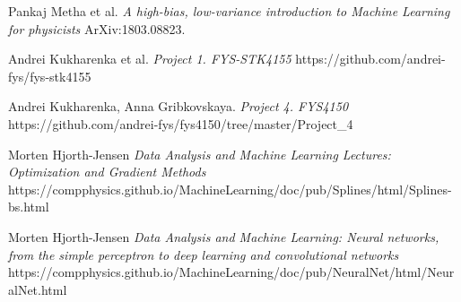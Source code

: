 \documentclass[10pt]{article}
\begin{document}
\newpage
\begin{thebibliography}{9}
	Pankaj Metha et al. 
	\textit{A high-bias, low-variance introduction to Machine Learning for physicists}
	ArXiv:1803.08823.
	
	Andrei Kukharenka et al.
	\textit{Project 1. FYS-STK4155 }
	https://github.com/andrei-fys/fys-stk4155
	
	Andrei Kukharenka, Anna Gribkovskaya.
	\textit{Project 4. FYS4150 }
	https://github.com/andrei-fys/fys4150/tree/master/Project_4
	
	Morten Hjorth-Jensen 
	\textit{Data Analysis and Machine Learning Lectures: Optimization and Gradient Methods}
	https://compphysics.github.io/MachineLearning/doc/pub/Splines/html/Splines-bs.html
		
	Morten Hjorth-Jensen 
	\textit{Data Analysis and Machine Learning: Neural networks, from the simple perceptron to deep learning and convolutional networks}
	https://compphysics.github.io/MachineLearning/doc/pub/NeuralNet/html/NeuralNet.html
	
\end{thebibliography}
\end{document}
